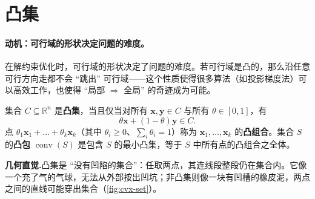 \section{凸集}
\label{sec:cvx-set}

\paragraph{动机：可行域的形状决定问题的难度。}
在解约束优化时，可行域的形状决定了问题的难度。若可行域是凸的，那么沿任意可行方向走都不会 “跳出” 可行域——这个性质使得很多算法（如投影梯度法）可以高效工作，也使得 “局部 $\Rightarrow$ 全局” 的奇迹成为可能。

\begin{definition}[凸集与凸组合]\label{def:convex-set}
集合 $C\subseteq\mathbb{R}^n$ 是\textbf{凸集}，当且仅当对所有 $\mathbf x,\mathbf y\in C$ 与所有 $\theta\in[0,1]$，有
\begin{equation}
  \theta\mathbf x+(1-\theta)\mathbf y\in C.
  \label{eq:convex-set-def}
\end{equation}
点 $\theta_1\mathbf x_1+\dots+\theta_k\mathbf x_k$（其中 $\theta_i\ge0$、$\sum_i\theta_i=1$）称为 $\mathbf x_1,\dots,\mathbf x_k$ 的\textbf{凸组合}。集合 $S$ 的\textbf{凸包} $\operatorname{conv}(S)$ 是包含 $S$ 的最小凸集，等于 $S$ 中所有点的凸组合之全体。
\end{definition}

\noindent\textbf{几何直觉.}\;凸集是 “没有凹陷的集合”：任取两点，其连线段整段仍在集合内。它像一个充了气的气球，无法从外部按出凹坑；非凸集则像一块有凹槽的橡皮泥，两点之间的直线可能穿出集合（\cref{fig:cvx-set}）。

